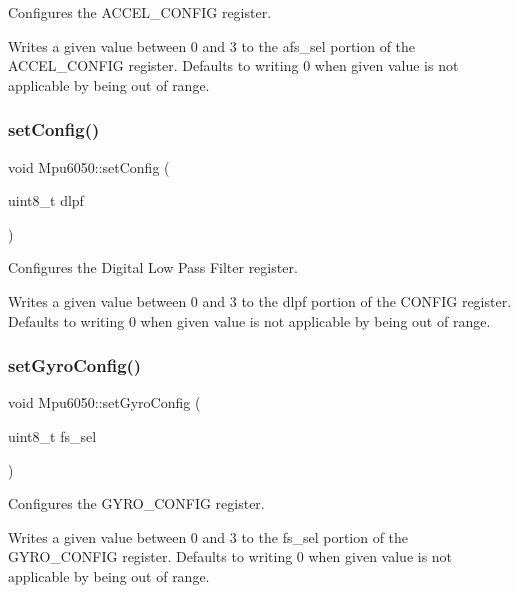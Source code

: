 Configures the A\+C\+C\+E\+L\+\_\+\+C\+O\+N\+F\+IG register. 

Writes a given value between 0 and 3 to the afs\+\_\+sel portion of the A\+C\+C\+E\+L\+\_\+\+C\+O\+N\+F\+IG register. Defaults to writing 0 when given value is not applicable by being out of range. \mbox{\label{classMpu6050_a39dc9a11251acf10c9c3b24e84ec8a57}} 
\subsubsection{\texorpdfstring{set\+Config()}{setConfig()}}
{\footnotesize\ttfamily void Mpu6050\+::set\+Config (\begin{DoxyParamCaption}\item[{uint8\+\_\+t}]{dlpf }\end{DoxyParamCaption})\hspace{0.3cm}{\ttfamily [virtual]}}



Configures the Digital Low Pass Filter register. 

Writes a given value between 0 and 3 to the dlpf portion of the C\+O\+N\+F\+IG register. Defaults to writing 0 when given value is not applicable by being out of range. \mbox{\label{classMpu6050_aef89bc30955f1db83eed1bb0dc9ec175}} 
\subsubsection{\texorpdfstring{set\+Gyro\+Config()}{setGyroConfig()}}
{\footnotesize\ttfamily void Mpu6050\+::set\+Gyro\+Config (\begin{DoxyParamCaption}\item[{uint8\+\_\+t}]{fs\+\_\+sel }\end{DoxyParamCaption})\hspace{0.3cm}{\ttfamily [virtual]}}



Configures the G\+Y\+R\+O\+\_\+\+C\+O\+N\+F\+IG register. 

Writes a given value between 0 and 3 to the fs\+\_\+sel portion of the G\+Y\+R\+O\+\_\+\+C\+O\+N\+F\+IG register. Defaults to writing 0 when given value is not applicable by being out of range. 

